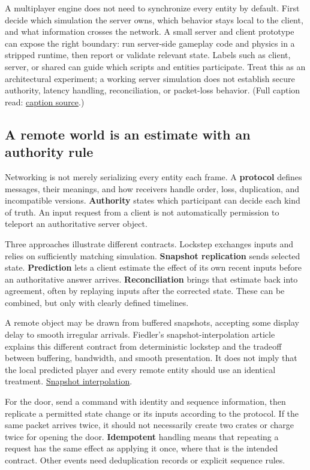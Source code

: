 A multiplayer engine does not need to synchronize every entity by default. First decide which simulation the server owns, which behavior stays local to the client, and what information crosses the network. A small server and client prototype can expose the right boundary: run server-side gameplay code and physics in a stripped runtime, then report or validate relevant state. Labels such as client, server, or shared can guide which scripts and entities participate. Treat this as an architectural experiment; a working server simulation does not establish secure authority, latency handling, reconciliation, or packet-loss behavior. (Full caption read: \href{https://www.youtube.com/watch?v=miNInZ806a0}{caption source}.)

\subsection{A remote world is an estimate with an authority rule}\label{06-engine-ii-ch040-a-remote-world-is-an-estimate-with-an-authority-rule}

Networking is not merely serializing every entity each frame. A \textbf{protocol} defines messages, their meanings, and how receivers handle order, loss, duplication, and incompatible versions. \textbf{Authority} states which participant can decide each kind of truth. An input request from a client is not automatically permission to teleport an authoritative server object.

Three approaches illustrate different contracts. Lockstep exchanges inputs and relies on sufficiently matching simulation. \textbf{Snapshot replication} sends selected state. \textbf{Prediction} lets a client estimate the effect of its own recent inputs before an authoritative answer arrives. \textbf{Reconciliation} brings that estimate back into agreement, often by replaying inputs after the corrected state. These can be combined, but only with clearly defined timelines.

A remote object may be drawn from buffered snapshots, accepting some display delay to smooth irregular arrivals. Fiedler's snapshot-interpolation article explains this different contract from deterministic lockstep and the tradeoff between buffering, bandwidth, and smooth presentation. It does not imply that the local predicted player and every remote entity should use an identical treatment. \href{https://gafferongames.com/post/snapshot_interpolation/}{Snapshot interpolation}.

For the door, send a command with identity and sequence information, then replicate a permitted state change or its inputs according to the protocol. If the same packet arrives twice, it should not necessarily create two crates or charge twice for opening the door. \textbf{Idempotent} handling means that repeating a request has the same effect as applying it once, where that is the intended contract. Other events need deduplication records or explicit sequence rules.

